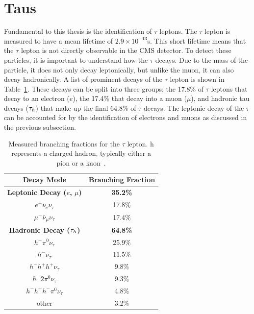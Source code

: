 \section{Taus}
\label{sec:taus}

Fundamental to this thesis is the identification of $\tau$ leptons.
The $\tau$ lepton is measured to have a mean lifetime of \(2.9 \times 10^{-13}\)s. 
This short lifetime means that the $\tau$ lepton is not directly observable in the \ac{CMS} detector.  
To detect these particles, it is important to understand how the $\tau$ decays. 
Due to the mass of the particle, it does not only decay leptonically, but unlike the muon, it can also decay hadronically.
A list of prominent decays of the $\tau$ lepton is shown in Table~\ref{tab:tau_decay}.
These decays can be split into three groups: the 17.8\% of $\tau$ leptons that decay to an electron ($e$), the 17.4\% that decay into a muon ($\mu$), and hadronic tau decays ($\tau_{h}$) that make up the final 64.8\% of $\tau$ decays. 
The leptonic decay of the $\tau$ can be accounted for by the identification of electrons and muons as discussed in the previous subsection.  \\

\begin{table}[t]
    \centering
    \begin{tabular}{|c|c|}
         \hline
         Decay Mode & Branching Fraction  \\
         \hline
         \hline
         \textbf{Leptonic Decay ($e$, $\mu$)} & \textbf{35.2\%} \\
         $e^- \bar{\nu}_e \nu_\tau $ & 17.8\% \\
         $\mu^- \bar{\nu}_\mu \nu_\tau $ & 17.4\% \\
         \hline
         \textbf{Hadronic Decay ($\tau_{h}$)} & \textbf{64.8\%} \\
         $h^- \pi^0 \nu_\tau $ & 25.9\% \\
         $h^- \nu_\tau$ & 11.5\% \\
         $h^- h^+ h^+ \nu_\tau$ & 9.8\% \\
         $h^- 2\pi^0 \nu_\tau$ & 9.3\% \\
         $h^- h^+ h^- \pi^0 \nu_\tau$ & 4.8\% \\
         other & 3.2\% \\
         \hline
    \end{tabular}
    \caption[Branching fractions of the $\tau$ lepton.]{Measured branching fractions for the $\tau$ lepton. h represents a charged hadron, typically either a pion or a kaon~\cite{ParticleDataGroup:2022pth}.}
    \label{tab:tau_decay}
\end{table}

